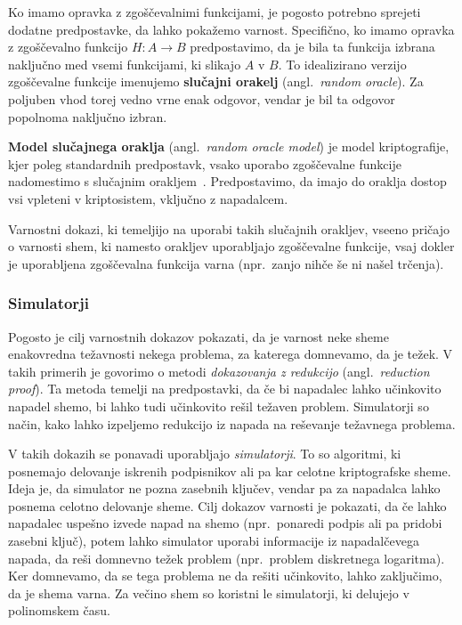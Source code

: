 \documentclass[isrm2, tisk]{fmfdelo}
\begin{document}
Ko imamo opravka z zgoščevalnimi funkcijami, je pogosto potrebno sprejeti dodatne predpostavke, da lahko 
pokažemo varnost. Specifično, ko imamo opravka z zgoščevalno funkcijo $H: A \rightarrow B$ predpostavimo, 
da je bila ta funkcija izbrana naključno med vsemi funkcijami, ki slikajo $A$ v $B$. To idealizirano 
verzijo zgoščevalne funkcije imenujemo \textbf{slučajni orakelj} (angl.\ \textit{random oracle}).
Za poljuben vhod torej vedno vrne enak odgovor, vendar je bil ta odgovor popolnoma naključno izbran.

\textbf{Model slučajnega oraklja} (angl.\ \textit{random oracle model}) je model kriptografije, kjer poleg 
standardnih predpostavk, vsako uporabo zgoščevalne funkcije nadomestimo s slučajnim 
orakljem~\cite{boneh2023appcry}. Predpostavimo, da imajo do oraklja dostop vsi vpleteni v kriptosistem, 
vključno z napadalcem.

Varnostni dokazi, ki temeljijo na uporabi takih slučajnih orakljev, vseeno pričajo o varnosti shem,
ki namesto orakljev uporabljajo zgoščevalne funkcije, vsaj dokler je uporabljena zgoščevalna funkcija
varna (npr.\ zanjo nihče še ni našel trčenja).

\subsubsection{Simulatorji}
Pogosto je cilj varnostnih dokazov pokazati, da je varnost neke sheme enakovredna težavnosti nekega
problema, za katerega domnevamo, da je težek. V takih primerih je govorimo o metodi
\textit{dokazovanja z redukcijo} (angl.\ \textit{reduction proof}). Ta metoda temelji na
predpostavki, da če bi napadalec lahko učinkovito napadel shemo, bi lahko tudi učinkovito rešil težaven
problem. Simulatorji so način, kako lahko izpeljemo redukcijo iz napada na reševanje težavnega problema.

V takih dokazih se ponavadi uporabljajo \textit{simulatorji}. To so algoritmi, ki posnemajo delovanje
iskrenih podpisnikov ali pa kar celotne kriptografske sheme. Ideja je, da simulator ne pozna zasebnih
ključev, vendar pa za napadalca lahko posnema celotno delovanje sheme. Cilj dokazov varnosti je
pokazati, da če lahko napadalec uspešno izvede napad na shemo (npr.\ ponaredi podpis ali pa pridobi
zasebni ključ), potem lahko simulator uporabi informacije iz napadalčevega napada, da reši domnevno
težek problem (npr.\ problem diskretnega logaritma). Ker domnevamo, da se tega problema ne da rešiti
učinkovito, lahko zaključimo, da je shema varna. Za večino shem so koristni le simulatorji, ki
delujejo v polinomskem času.
\end{document}
